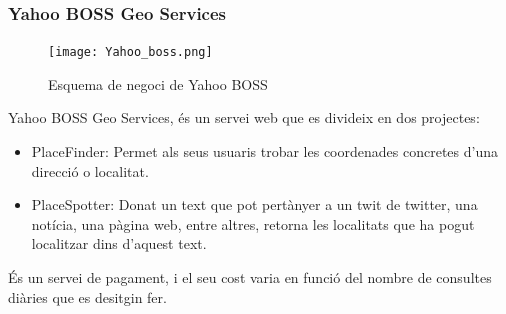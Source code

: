 \documentclass[12pt,a4paper,openright,oneside]{article}
\numberwithin{equation}{section}
\theoremstyle{definition}
\begin{document}
\subsubsection*{Yahoo BOSS Geo Services}

\begin{figure}[htbp]
\centering
\texttt{[image: Yahoo\_boss.png]}
\caption{Esquema de negoci de Yahoo BOSS}
\end{figure}
Yahoo BOSS Geo Services, és un servei web que es divideix en dos projectes:
\begin{itemize}
\item PlaceFinder: Permet als seus usuaris trobar les coordenades concretes d'una direcció o localitat.
\item PlaceSpotter: Donat un text que pot pertànyer a un twit de twitter, una notícia, una pàgina web, entre altres, retorna les localitats que ha pogut localitzar dins d'aquest text.
\end{itemize}
És un servei de pagament, i el seu cost varia en funció del nombre de consultes diàries que es desitgin fer.\cite{BOSS}
\end{document}
